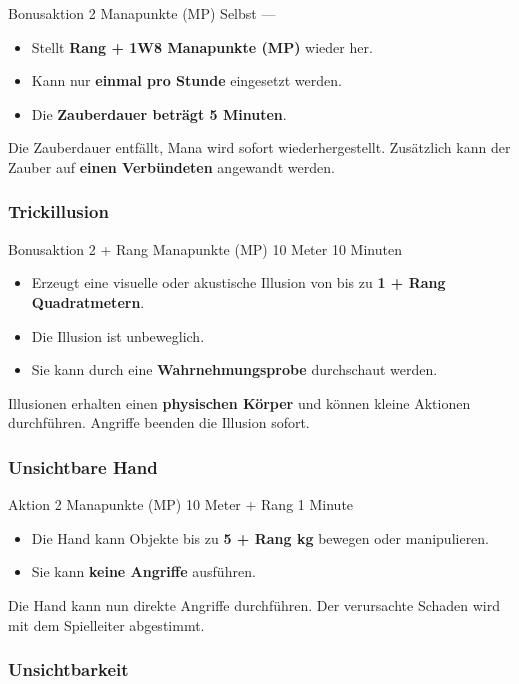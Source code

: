 \spellcard
{}
{Bonusaktion}
{2 Manapunkte (MP)}
{Selbst}
{—}
{
	\begin{itemize}
		\item Stellt \textbf{Rang + 1W8 Manapunkte (MP)} wieder her.
		\item Kann nur \textbf{einmal pro Stunde} eingesetzt werden.
		\item Die \textbf{Zauberdauer beträgt 5 Minuten}.
	\end{itemize}
}
{
	Die Zauberdauer entfällt, Mana wird sofort wiederhergestellt.
	Zusätzlich kann der Zauber auf \textbf{einen Verbündeten}
	angewandt werden.
}


\subsubsection*{Trickillusion}

\spellcard
{}
{Bonusaktion}
{2 + Rang Manapunkte (MP)}
{10 Meter}
{10 Minuten}
{
	\begin{itemize}
		\item Erzeugt eine visuelle oder akustische Illusion von bis zu
		\textbf{1 + Rang Quadratmetern}.
		\item Die Illusion ist unbeweglich.
		\item Sie kann durch eine \textbf{Wahrnehmungsprobe} durchschaut werden.
	\end{itemize}
}
{
	Illusionen erhalten einen \textbf{physischen Körper} und können
	kleine Aktionen durchführen.
	Angriffe beenden die Illusion sofort.
}


\subsubsection*{Unsichtbare Hand}

\spellcard
{}
{Aktion}
{2 Manapunkte (MP)}
{10 Meter + Rang}
{1 Minute}
{
	\begin{itemize}
		\item Die Hand kann Objekte bis zu \textbf{5 + Rang kg} bewegen oder manipulieren.
		\item Sie kann \textbf{keine Angriffe} ausführen.
	\end{itemize}
}
{
	Die Hand kann nun direkte Angriffe durchführen.
	Der verursachte Schaden wird mit dem Spielleiter abgestimmt.
}


\subsubsection*{Unsichtbarkeit}

